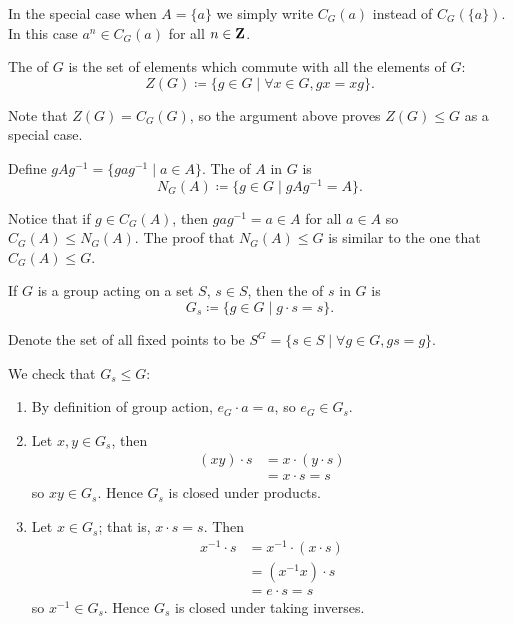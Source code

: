 \begin{notation}
In the special case when $A=\{a\}$ we simply write $C_G(a)$ instead of $C_G(\{a\})$. In this case $a^n\in C_G(a)$ for all $n\in\mathbf Z$.
\end{notation}

\begin{definition}[Centre]
The  of $G$ is the set of elements which commute with all the elements of $G$:
\[Z(G)\coloneqq\{g\in G\mid\forall x\in G,gx=xg\}.\]
\end{definition}

Note that $Z(G)=C_G(G)$, so the argument above proves $Z(G)\le G$ as a special case.

\begin{definition}[Normaliser]
Define $gAg^{-1}=\{gag^{-1}\mid a\in A\}$. The  of $A$ in $G$ is
\[N_G(A)\coloneqq\{g\in G\mid gAg^{-1}=A\}.\]
\end{definition}

Notice that if $g\in C_G(A)$, then $gag^{-1}=a\in A$ for all $a\in A$ so $C_G(A)\le N_G(A)$. The proof that $N_G(A)\le G$ is similar to the one that $C_G(A)\le G$.

\begin{definition}[Stabiliser]
If $G$ is a group acting on a set $S$, $s\in S$, then the  of $s$ in $G$ is
\[G_s\coloneqq\{g\in G\mid g\cdot s=s\}.\]
\end{definition}

\begin{notation}
Denote the set of all fixed points to be $S^G=\{s\in S\mid\forall g\in G, gs=g\}$.
\end{notation}

We check that $G_s\le G$:
\begin{enumerate}[label=(\roman*)]
\item By definition of group action, $e_G\cdot a=a$, so $e_G\in G_s$.
\item Let $x,y\in G_s$, then
\begin{align*}
(xy)\cdot s&=x\cdot(y\cdot s)\\
&=x\cdot s=s
\end{align*}
so $xy\in G_s$. Hence $G_s$ is closed under products.
\item Let $x\in G_s$; that is, $x\cdot s=s$. Then
\begin{align*}
x^{-1}\cdot s&=x^{-1}\cdot(x\cdot s)\\
&=(x^{-1}x)\cdot s\\
&=e\cdot s=s
\end{align*}
so $x^{-1}\in G_s$. Hence $G_s$ is closed under taking inverses.
\end{enumerate}

